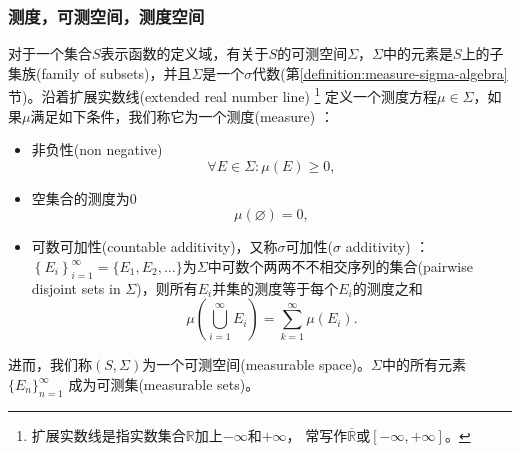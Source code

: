 \subsubsection{测度，可测空间，测度空间}
\label{sec:measure-measure}
\begin{definition}[测度]
  对于一个集合$S$表示函数的定义域，有关于$S$的可测空间$\Sigma$，$\Sigma$中的元素是$S$上的子集族(family of subsets)，并且$\Sigma$是一个$\sigma$代数(第\ref{definition:measure-sigma-algebra}节)。沿着扩展实数线(extended real number line) 
  \footnote{扩展实数线是指实数集合$\mathbb{R}$加上$-\infty$和$+\infty$，
  常写作$\overline{\mathbb{R}}$或$\left[ -\infty, +\infty \right]$。}
  定义一个测度方程$\mu \in \Sigma$，如果$\mu$满足如下条件，我们称它为一个测度(measure) ：
  \begin{itemize}
    \item 非负性(non negative)
    \begin{equation*}
      \forall E \in \Sigma: \mu(E) \ge 0,
    \end{equation*}
    \item 空集合的测度为$0$
    \begin{equation}
      \mu(\varnothing) = 0,
    \end{equation}
    \item 可数可加性(countable additivity)，又称$\sigma$可加性($\sigma$ additivity) ：$\left\{ E_i \right\}_{i=1}^{\infty}  = \{ E_1,E_2,\ldots \}$为$\Sigma$中可数个两两不不相交序列的集合(pairwise disjoint sets in $\Sigma$)，则所有$E_i$并集的测度等于每个$E_i$的测度之和
    \begin{equation*}
      \mu \left( \bigcup_{i=1}^{\infty} E_i \right) = \sum_{k=1}^{\infty} \mu(E_i).
    \end{equation*}
  \end{itemize}
\end{definition}

\begin{definition}[可测空间]
进而，我们称$\left( S, \Sigma \right)$为一个可测空间(measurable space)。$\Sigma$中的所有元素$\{ E_n \}_{n=1}^{\infty}$ 成为可测集(measurable sets)。
\end{definition}

